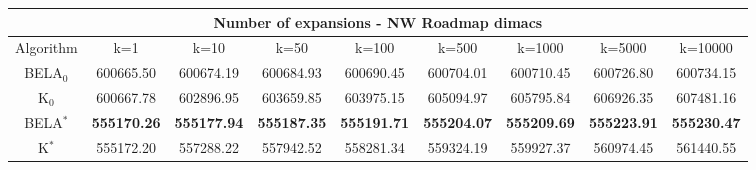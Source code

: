 \begin{tabular}{c|cccccccc}\toprule
\multicolumn{9}{c}{Number of expansions - NW Roadmap dimacs}\\ \midrule
Algorithm & k=1 & k=10 & k=50 & k=100 & k=500 & k=1000 & k=5000 & k=10000 \\ \midrule
BELA$_0$ & 600665.50 & 600674.19 & 600684.93 & 600690.45 & 600704.01 & 600710.45 & 600726.80 & 600734.15 \\
K$_0$ & 600667.78 & 602896.95 & 603659.85 & 603975.15 & 605094.97 & 605795.84 & 606926.35 & 607481.16 \\
BELA$^*$ & \textbf{555170.26} & \textbf{555177.94} & \textbf{555187.35} & \textbf{555191.71} & \textbf{555204.07} & \textbf{555209.69} & \textbf{555223.91} & \textbf{555230.47} \\
K$^*$ & 555172.20 & 557288.22 & 557942.52 & 558281.34 & 559324.19 & 559927.37 & 560974.45 & 561440.55 \\ \bottomrule 
\end{tabular}
